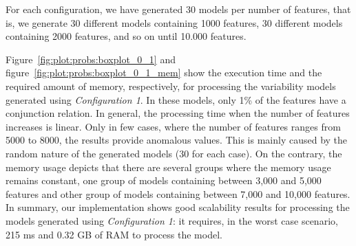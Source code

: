 For each configuration, we have generated 30 models per number of features, that is, we generate 
30 different models containing 1000 features, 30 different models containing 2000 features,
and so on until 10.000 features.

Figure~\ref{fig:plot:probs:boxplot_0_1} and figure~\ref{fig:plot:probs:boxplot_0_1_mem} show the execution time and the required amount of memory, respectively, for processing the variability models generated using \textit{Configuration 1}. In these models, only 1\% of the features have a conjunction relation. In general, the processing time when the number of features increases is linear. Only in few cases, where the number of features ranges from 5000 to 8000, the results provide anomalous values. This is mainly caused by the random nature of the generated models (30 for each case). On the contrary, the memory usage depicts that there are several groups where the memory usage remains constant, one group of models containing between 3,000 and 5,000 features and other group of models containing between 7,000 and 10,000 features. In summary, our implementation shows good scalability results for processing the models generated using \textit{Configuration 1}: it requires, in the worst case scenario, 215 ms and 0.32 GB of RAM to process the model.

